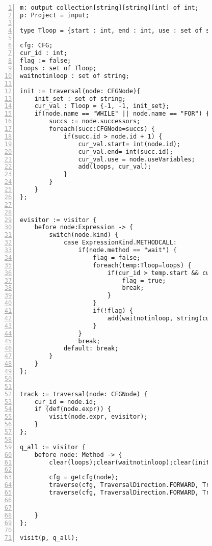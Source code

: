 \begin{figure}[ht!]
\begin{lstlisting}[numbers=left, tabsize=4, escapechar=@, caption={Wait not in loop},label={lst:wnil-code}, lastline = 55] 
m: output collection[string][string][int] of int;
p: Project = input;

type Tloop = {start : int, end : int, use : set of string};

cfg: CFG;
cur_id : int;
flag := false;
loops : set of Tloop;
waitnotinloop : set of string;

init := traversal(node: CFGNode){
	init_set : set of string;
	cur_val : Tloop = {-1, -1, init_set};
	if(node.name == "WHILE" || node.name == "FOR") {
		succs := node.successors;
		foreach(succ:CFGNode=succs) {
			if(succ.id > node.id + 1) {
				cur_val.start= int(node.id);
				cur_val.end= int(succ.id);
				cur_val.use = node.useVariables;
				add(loops, cur_val);
			}		
		}
	}
};


evisitor := visitor {
	before node:Expression -> {
		switch(node.kind) {
			case ExpressionKind.METHODCALL: 
				if(node.method == "wait") {
					flag = false;
					foreach(temp:Tloop=loops) {
						if(cur_id > temp.start && cur_id < temp.end) {
							flag = true;
							break;
						}
					}
					if(!flag) {
						add(waitnotinloop, string(cur_id));
					}
				}
  				break;
			default: break;
		}
	}
};


track := traversal(node: CFGNode) {
	cur_id = node.id;
	if (def(node.expr)) {
		visit(node.expr, evisitor);
	}
};

q_all := visitor {
	before node: Method -> {
		clear(loops);clear(waitnotinloop);clear(init);clear(track);

		cfg = getcfg(node);
		traverse(cfg, TraversalDirection.FORWARD, TraversalKind.DFS, init);
		traverse(cfg, TraversalDirection.FORWARD, TraversalKind.DFS, track);


	}
};

visit(p, q_all);
\end{lstlisting}
\end{figure}